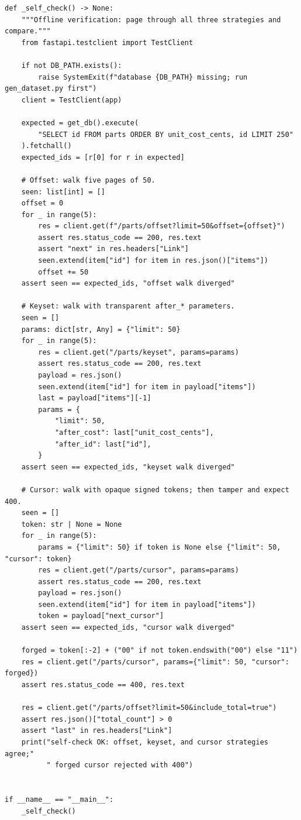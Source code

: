 \begin{verbatim}
def _self_check() -> None:
    """Offline verification: page through all three strategies and compare."""
    from fastapi.testclient import TestClient

    if not DB_PATH.exists():
        raise SystemExit(f"database {DB_PATH} missing; run gen_dataset.py first")
    client = TestClient(app)

    expected = get_db().execute(
        "SELECT id FROM parts ORDER BY unit_cost_cents, id LIMIT 250"
    ).fetchall()
    expected_ids = [r[0] for r in expected]

    # Offset: walk five pages of 50.
    seen: list[int] = []
    offset = 0
    for _ in range(5):
        res = client.get(f"/parts/offset?limit=50&offset={offset}")
        assert res.status_code == 200, res.text
        assert "next" in res.headers["Link"]
        seen.extend(item["id"] for item in res.json()["items"])
        offset += 50
    assert seen == expected_ids, "offset walk diverged"

    # Keyset: walk with transparent after_* parameters.
    seen = []
    params: dict[str, Any] = {"limit": 50}
    for _ in range(5):
        res = client.get("/parts/keyset", params=params)
        assert res.status_code == 200, res.text
        payload = res.json()
        seen.extend(item["id"] for item in payload["items"])
        last = payload["items"][-1]
        params = {
            "limit": 50,
            "after_cost": last["unit_cost_cents"],
            "after_id": last["id"],
        }
    assert seen == expected_ids, "keyset walk diverged"

    # Cursor: walk with opaque signed tokens; then tamper and expect 400.
    seen = []
    token: str | None = None
    for _ in range(5):
        params = {"limit": 50} if token is None else {"limit": 50, "cursor": token}
        res = client.get("/parts/cursor", params=params)
        assert res.status_code == 200, res.text
        payload = res.json()
        seen.extend(item["id"] for item in payload["items"])
        token = payload["next_cursor"]
    assert seen == expected_ids, "cursor walk diverged"

    forged = token[:-2] + ("00" if not token.endswith("00") else "11")
    res = client.get("/parts/cursor", params={"limit": 50, "cursor": forged})
    assert res.status_code == 400, res.text

    res = client.get("/parts/offset?limit=50&include_total=true")
    assert res.json()["total_count"] > 0
    assert "last" in res.headers["Link"]
    print("self-check OK: offset, keyset, and cursor strategies agree;" 
          " forged cursor rejected with 400")


if __name__ == "__main__":
    _self_check()
\end{verbatim}

